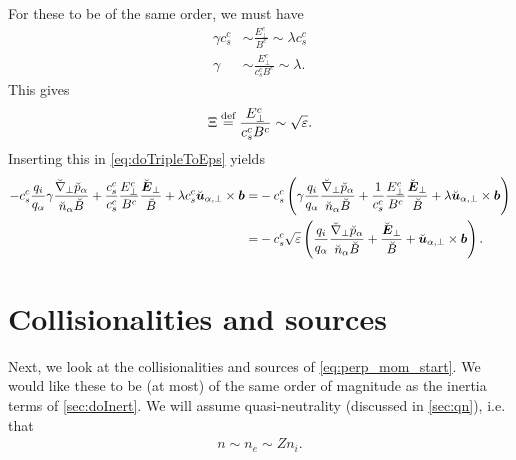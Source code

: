 %
For these to be of the same order, we must have
%
\begin{align*}
    \gamma c^c_s &\sim \frac{E_\perp^c}{B^c} \sim \lambda c^c_s \\
    \gamma     &\sim \frac{E_\perp^c}{c^c_sB^c} \sim \lambda.
\end{align*}
%
This gives
%
\begin{align*}
    \Xi \overset{\text{def}}{=} \frac{E_\perp^c}{c^c_sB^c} \sim \sqrt{\varepsilon}.
\end{align*}
%
Inserting this in \cref{eq:doTripleToEps} yields
%
\begin{align*}
-
c^c_s
\frac{q_i}{q_\a}
\gamma
\frac{ \breve{\grad}_\perp \breve{p}_\a }{\breve{n}_\a \breve{B}}
+ \frac{c^c_s}{c^c_s}\frac{E_\perp^c}{B^c}
\frac{\breve{\ve{E}}_\perp}{\breve{B}}
+\lambda c^c_s
\breve{\ve{u}}_{\a,\perp}\times\ve{b}
=&
-
c^c_s
\L(
\gamma
\frac{q_i}{q_\a}
\frac{ \breve{\grad}_\perp \breve{p}_\a }{\breve{n}_\a \breve{B}}
+ \frac{1}{c^c_s}\frac{E_\perp^c}{B^c}
\frac{\breve{\ve{E}}_\perp}{\breve{B}}
+\lambda
\breve{\ve{u}}_{\a,\perp}\times\ve{b}
\R)
\\
%
%
=&
-
c^c_s
\sqrt{\e}
\L(
\frac{q_i}{q_\a}
\frac{ \breve{\grad}_\perp \breve{p}_\a }{\breve{n}_\a \breve{B}}
+
\frac{\breve{\ve{E}}_\perp}{\breve{B}}
+
\breve{\ve{u}}_{\a,\perp}\times\ve{b}
\R).
\end{align*}

\section{Collisionalities and sources}
%
Next, we look at the collisionalities and sources of \cref{eq:perp_mom_start}.
We would like these to be (at most) of the same order of magnitude as the inertia terms of \cref{sec:doInert}.
We will assume quasi-neutrality (discussed in \cref{sec:qn}), i.e. that
%
\begin{align*}
    n\sim n_e \sim Zn_i.
\end{align*}
%

